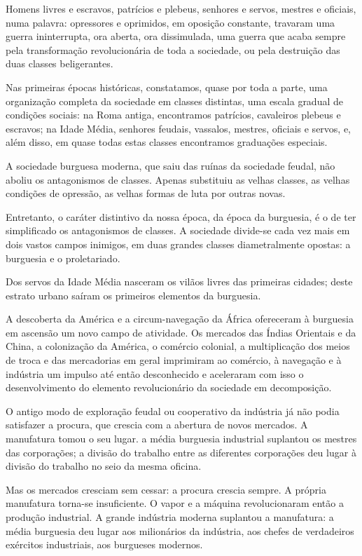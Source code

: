 Homens livres e escravos, patrícios e plebeus, senhores e servos,
mestres e oficiais, numa palavra: opressores e oprimidos, em oposição
constante, travaram uma guerra ininterrupta, ora aberta, ora
dissimulada, uma guerra que acaba sempre pela transformação
revolucionária de toda a sociedade, ou pela destruição das duas
classes beligerantes.

Nas primeiras épocas históricas, constatamos, quase por toda a parte,
uma organização completa da sociedade em classes distintas, uma escala
gradual de condições sociais: na Roma antiga, encontramos patrícios,
cavaleiros plebeus e escravos; na Idade Média, senhores feudais,
vassalos, mestres, oficiais e servos, e, além disso, em quase todas
estas classes encontramos graduações especiais.

A sociedade burguesa moderna, que saiu das ruínas da sociedade feudal,
não aboliu os antagonismos de classes. Apenas substituiu as velhas
classes, as velhas condições de opressão, as velhas formas de luta por
outras novas.

Entretanto, o caráter distintivo da nossa época, da época da
burguesia, é o de ter simplificado os antagonismos de classes. A
sociedade divide-se cada vez mais em dois vastos campos inimigos, em
duas grandes classes diametralmente opostas: a burguesia e o
proletariado.

Dos servos da Idade Média nasceram os vilãos livres das primeiras
cidades; deste estrato urbano saíram os primeiros elementos da
burguesia.

A descoberta da América e a circum-navegação da África ofereceram à
burguesia em ascensão um novo campo de atividade. Os mercados das
Índias Orientais e da China, a colonização da América, o comércio
colonial, a multiplicação dos meios de troca e das mercadorias em
geral imprimiram ao comércio, à navegação e à indústria um impulso até
então desconhecido e aceleraram com isso o desenvolvimento do elemento
revolucionário da sociedade em decomposição.

O antigo modo de exploração feudal ou cooperativo da indústria já não
podia satisfazer a procura, que crescia com a abertura de novos
mercados. A manufatura tomou o seu lugar. a média burguesia industrial
suplantou os mestres das corporações; a divisão do trabalho entre as
diferentes corporações deu lugar à divisão do trabalho no seio da
mesma oficina.

Mas os mercados cresciam sem cessar: a procura crescia sempre. A
própria manufatura torna-se insuficiente. O vapor e a máquina
revolucionaram então a produção industrial. A grande indústria moderna
suplantou a manufatura: a média burguesia deu lugar aos milionários da
indústria, aos chefes de verdadeiros exércitos industriais, aos
burgueses modernos.

